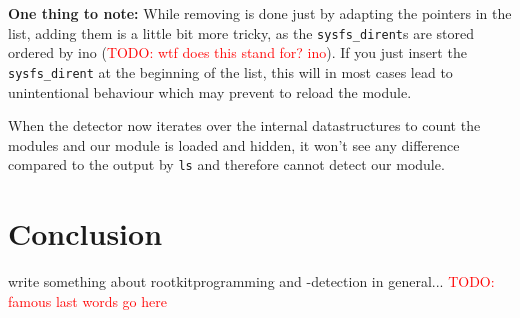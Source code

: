 \documentclass[10pt, letterpaper]{article}
\newcommand{\todo}[1]{\textcolor{red}{TODO: #1}}
\begin{document}
\textbf{One thing to note:} While removing is done just by adapting the pointers in the list, adding them is a little bit more tricky, as 
the \texttt{sysfs\_dirent}s are stored ordered by ino (\todo{wtf does this stand for? ino}). If you just insert the \texttt{sysfs\_dirent} at the beginning of the list, this will in most cases lead to unintentional behaviour which may prevent to reload the module.

When the detector now iterates over the internal datastructures to count the modules and our module is loaded and hidden, it won't see any difference compared to the output by \texttt{ls} and therefore cannot detect our module.

\section{Conclusion}
write something about rootkitprogramming and -detection in general...
\todo{famous last words go here}
\end{document}
